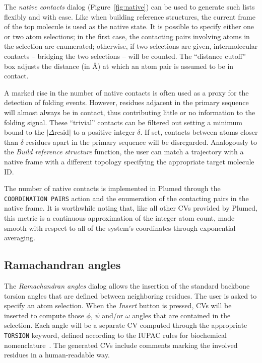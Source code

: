 \documentclass[preprint,12pt]{elsarticle}
\begin{document}
The \emph{native contacts} dialog (Figure~\ref{fig:native}) can be
used to generate such lists flexibly and with ease. Like when building
reference structures, the current frame of the top molecule is used as
the native state.  It is possible to specify either one or two atom
selections; in the first case, the contacting pairs involving atoms in
the selection are enumerated; otherwise, if two selections are given,
intermolecular contacts -- bridging the two selections -- will be
counted.  The ``distance cutoff'' box adjusts the distance (in \AA) at
which an atom pair is assumed to be in contact.

A marked rise in the number of native contacts is often used as a
proxy for the detection of folding events. However, residues adjacent
in the primary sequence will almost always be in contact, thus
contributing little or no information to the folding signal. These
``trivial'' contacts can be filtered out setting a minimum bound to
the $| \Delta \mbox{resid} |$ to a positive integer $\delta$. If set,
contacts between atoms closer than $\delta$ residues apart in the
primary sequence will be disregarded.
Analogously to the \emph{Build reference structure} function, the user
can match a trajectory with a native frame with a different topology
specifying the appropriate target molecule ID.

The number of native contacts is implemented in Plumed through the
\texttt{COORDINATION PAIRS} action and the enumeration of the
contacting pairs in the native frame.  It is worthwhile noting that,
like all other CVs provided by Plumed, this metric is a continuous
approximation of the integer atom count, made smooth with respect to
all of the system's coordinates through exponential averaging.




\subsection{Ramachandran angles}

The \emph{Ramachandran angles} dialog allows the insertion of the
standard backbone torsion angles that are defined between neighboring residues.
The user is asked to specify an atom selection. When the \emph{Insert}
button is pressed, CVs will be inserted to compute those $\phi$,
$\psi$ and/or $\omega$ angles that are contained in the
selection. Each angle will be a separate CV computed through the
appropriate \texttt{TORSION} keyword, defined according to the IUPAC
rules for biochemical nomenclature~\cite{IUPAC}. The generated CVs
include comments marking the involved residues in a human-readable
way.
\end{document}
